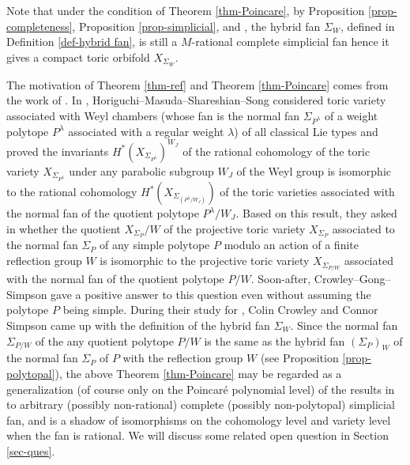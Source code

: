\documentclass{amsart}
\theoremstyle{definition}
\theoremstyle{remark}
\numberwithin{equation}{section}
\begin{document}
Note that under the condition of Theorem \ref{thm-Poincare}, by Proposition \ref{prop-completeness}, Proposition \ref{prop-simplicial}, and \cite[Proposition 2.5]{crowley2024toric}, the hybrid fan $\Sigma_W$, defined in Definition \ref{def-hybrid fan}, is still a $M$-rational complete simplicial fan hence it gives a compact toric orbifold $X_{\Sigma_W}$.

The motivation of Theorem \ref{thm-ref} and Theorem \ref{thm-Poincare} comes from the work of \cite{HMSS21-toric-orbifolds}. In \cite{HMSS21-toric-orbifolds}, Horiguchi--Masuda--Shareshian--Song considered toric variety associated with Weyl chambers (whose fan is the normal fan $\Sigma_{P^{\lambda}}$ of a weight polytope $P^\lambda$ associated with a regular weight $\lambda$) of all classical Lie types and proved the invariants $H^*\left(X_{\Sigma_{P^{\lambda}}}\right)^{W_J}$ of the rational cohomology of the toric variety $X_{\Sigma_{P^{\lambda}}}$ under any parabolic subgroup $W_J$ of the Weyl group is isomorphic to the rational cohomology $H^*\left(X_{\Sigma_{(P^{\lambda}/W_J)}}\right)$ of the toric varieties associated with the normal fan of the quotient polytope $P^{\lambda}/W_J$. Based on this result, they asked in \cite[Question 8.3]{HMSS21-toric-orbifolds} whether the quotient $X_{\Sigma_P}/W$ of the projective toric variety $X_{\Sigma_P}$ associated to the normal fan $\Sigma_P$ of any simple polytope $P$ modulo an action of a finite reflection group $W$ is isomorphic to the projective toric variety $X_{\Sigma_{P/W}}$ associated with the normal fan of the quotient polytope $P/W$. Soon-after, Crowley--Gong--Simpson\cite{crowley2024toric} gave a positive answer to this question even without assuming the polytope $P$ being simple. During their study for \cite[Question 8.3]{HMSS21-toric-orbifolds} , Colin Crowley and Connor Simpson came up with the definition of the hybrid fan $\Sigma_W$. Since the normal fan $\Sigma_{P / W}$ of the any quotient polytope $P / W$ is the same as the hybrid fan $\left(\Sigma_P\right)_W$ of the normal fan $\Sigma_P$ of $P$ with the reflection group $W$ (see Proposition \ref{prop-polytopal}), the above Theorem \ref{thm-Poincare} may be regarded as a generalization (of course only on the Poincar\'e polynomial level) of the results in \cite{HMSS21-toric-orbifolds} to arbitrary (possibly non-rational) complete (possibly non-polytopal) simplicial fan, and is a shadow of isomorphisms on the cohomology level and variety level when the fan is rational. We will discuss some related open question in Section \ref{sec-ques}.
\end{document}
